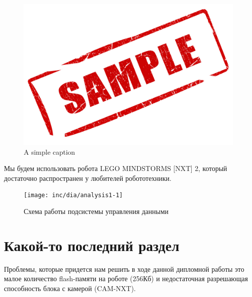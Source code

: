 \begin{figure}[ht!]
 \centering 
 \includegraphics[width=\textwidth]{inc/raster/sample.jpg} 
 \caption{A simple caption} 
 \label{overflow} 
\end{figure}

Мы будем использовать робота LEGO MINDSTORMS [NXT] 2, который достаточно распространен у любителей робототехники.
\begin{figure}
  \centering
  \texttt{[image: inc/dia/analysis1-1]}
  \caption{Схема работы подсистемы управления данными}
  \label{fig:fig05}
\end{figure}

\section{Какой-то последний раздел}
Проблемы, которые придется нам решить в ходе данной дипломной работы это малое количество flash-памяти на роботе (256Кб) и недостаточная разрешающая способность блока с камерой (CAM-NXT).

